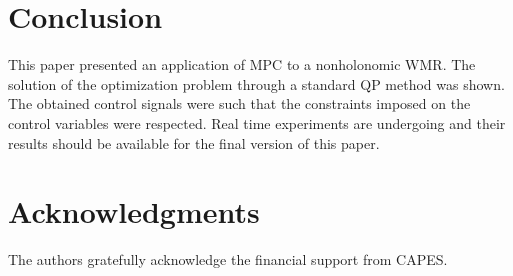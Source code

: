 \documentclass[conference]{IEEEtran} %
\begin{document}
\section{Conclusion}
\label{sec:conclusions}

This paper presented an application of MPC to a nonholonomic WMR. The
solution of the optimization problem through a standard QP method was shown.
The obtained control signals were such that the constraints imposed on the
control variables were respected. Real time experiments are undergoing and
their results should be available for the final version of this paper.

\section{Acknowledgments}

The authors gratefully acknowledge the financial support from CAPES.



\end{document}
